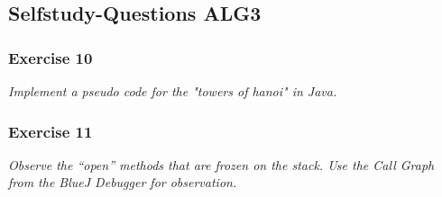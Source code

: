 \subsection{Selfstudy-Questions ALG3}

\subsubsection*{Exercise 10}
\textit{Implement a pseudo code for the "towers of hanoi" in Java.} \\

\subsubsection*{Exercise 11}
\textit{Observe the "`open"' methods that are frozen on the stack.
Use the Call Graph from the BlueJ Debugger for observation.} \\
